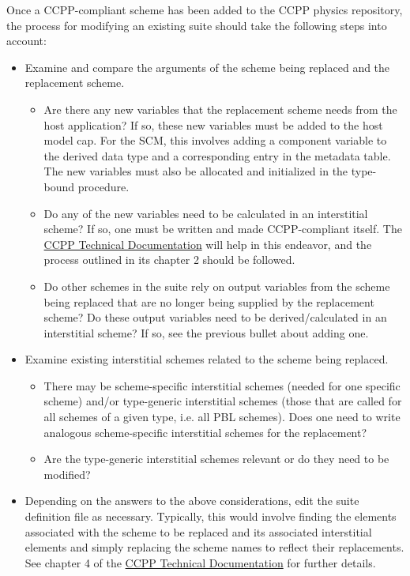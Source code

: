 Once a CCPP-compliant scheme has been added to the CCPP physics repository, the process for modifying an existing suite should take the following steps into account:

\begin{itemize}
\item Examine and compare the arguments of the scheme being replaced and the replacement scheme.
\begin{itemize}
\item Are there any new variables that the replacement scheme needs from the host application? If so, these new variables must be added to the host model cap. For the SCM, this involves adding a component variable to the  derived data type and a corresponding entry in the metadata table. The new variables must also be allocated and initialized in the  type-bound procedure.
\item Do any of the new variables need to be calculated in an interstitial scheme? If so, one must be written and made CCPP-compliant itself. The \href{https://ccpp-techdoc.readthedocs.io/en/v5.0.0/}{CCPP Technical Documentation} will help in this endeavor, and the process outlined in its chapter 2 should be followed.
\item Do other schemes in the suite rely on output variables from the scheme being replaced that are no longer being supplied by the replacement scheme? Do these output variables need to be derived/calculated in an interstitial scheme? If so, see the previous bullet about adding one.
\end{itemize}
\item Examine existing interstitial schemes related to the scheme being replaced.
\begin{itemize}
\item There may be scheme-specific interstitial schemes (needed for one specific scheme) and/or type-generic interstitial schemes (those that are called for all schemes of a given type, i.e. all PBL schemes). Does one need to write analogous scheme-specific interstitial schemes for the replacement?
\item Are the type-generic interstitial schemes relevant or do they need to be modified?
\end{itemize}
\item Depending on the answers to the above considerations, edit the suite definition file as necessary. Typically, this would involve finding the  elements associated with the scheme to be replaced and its associated interstitial  elements and simply replacing the scheme names to reflect their replacements. See chapter 4 of the \href{https://ccpp-techdoc.readthedocs.io/en/v5.0.0/}{CCPP Technical Documentation} for further details.
\end{itemize}

